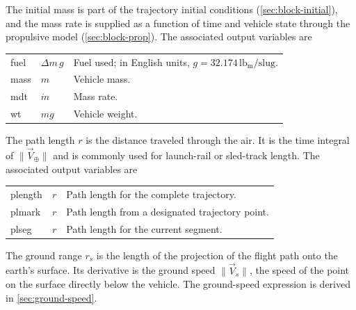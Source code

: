 
The initial mass is part of the trajectory initial conditions
(\cref{sec:block-initial}), and the mass rate is supplied as a function of time and
vehicle state through the propulsive model (\cref{sec:block-prop}). The associated
output variables are
\begin{longtable}{@{}>{\ttfamily}p{}p{}p{}@{}}
  fuel & $\Delta m\,g$ & Fuel used; in English units, $g=32.174\,\mathrm{lb_m/slug}$.\\
  mass & $m$ & Vehicle mass.\\
  mdt  & $\dot m$ & Mass rate.\\
  wt   & $m g$ & Vehicle weight.\\
\end{longtable}


The path length $r$ is the distance traveled through the air. It is the time integral
of $\lVert\vec V_{\oplus}\rVert$ and is commonly used for launch-rail or sled-track
length. The associated output variables are
\begin{longtable}{@{}>{\ttfamily}p{}p{}p{}@{}}
  plength & $r$ & Path length for the complete trajectory.\\
  plmark  & $r$ & Path length from a designated trajectory point.\\
  plseg   & $r$ & Path length for the current segment.\\
\end{longtable}


The ground range $r_s$ is the length of the projection of the flight path onto the
earth's surface. Its derivative is the ground speed
$\lVert\vec V_s\rVert$, the speed of the point on the surface directly below the
vehicle. The ground-speed expression is derived in \cref{sec:ground-speed}.



